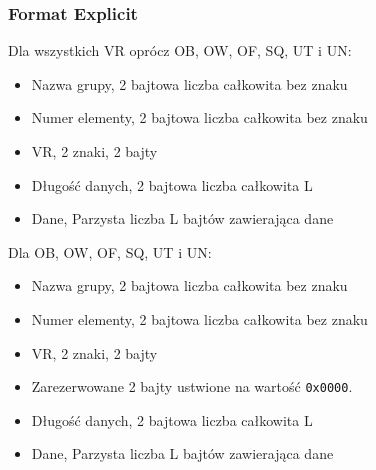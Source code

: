 \documentclass{beamer}
\begin{document}
\begin{frame}[allowframebreaks]
  \frametitle{Format Explicit}

Dla wszystkich VR oprócz OB, OW, OF, SQ, UT i UN:
\begin{itemize}
  \item Nazwa grupy, 2 bajtowa liczba całkowita bez znaku
  \item Numer elementy, 2 bajtowa liczba całkowita bez znaku
  \item VR, 2 znaki, 2 bajty
  \item Długość danych, 2 bajtowa liczba całkowita L
  \item Dane, Parzysta liczba L bajtów zawierająca dane  
\end{itemize}

\framebreak

Dla OB, OW, OF, SQ, UT i UN:
\begin{itemize}
  \item Nazwa grupy, 2 bajtowa liczba całkowita bez znaku
  \item Numer elementy, 2 bajtowa liczba całkowita bez znaku
  \item VR, 2 znaki, 2 bajty
  \item Zarezerwowane 2 bajty ustwione na wartość \texttt{0x0000}.
  \item Długość danych, 2 bajtowa liczba całkowita L
  \item Dane, Parzysta liczba L bajtów zawierająca dane  
\end{itemize}
\end{frame}




\end{document}
